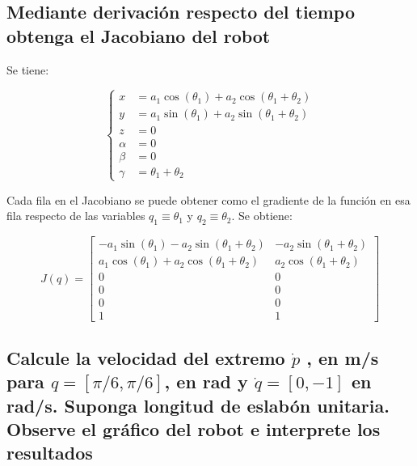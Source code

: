 \documentclass[a4paper,12pt]{article}
\begin{document}
\subsection{Mediante derivación respecto del tiempo obtenga el Jacobiano del robot}
Se tiene:

\begin{equation}
    \left\{
    \begin{aligned}
    x &= a_1 \cos(\theta_1) + a_2 \cos(\theta_1 + \theta_2) \\
    y &= a_1 \sin(\theta_1) + a_2 \sin(\theta_1 + \theta_2) \\
    z &= 0 \\
    \alpha &= 0 \\
    \beta &= 0 \\
    \gamma &= \theta_1 + \theta_2
    \end{aligned}
    \right.
    \label{directa RR}
\end{equation}

Cada fila en el Jacobiano se puede obtener como el gradiente de la función en esa fila
respecto de las variables $q_1\equiv\theta_1$ y $q_2\equiv\theta_2$. Se obtiene:

\begin{equation}
    J(q) = 
    \begin{bmatrix}
        -a_1\sin(\theta_1) - a_2\sin(\theta_1 + \theta_2) & -a_2\sin(\theta_1 + \theta_2)\\
        a_1\cos(\theta_1) + a_2\cos(\theta_1 + \theta_2)  & a_2\cos(\theta_1 + \theta_2)\\
        0                                                 & 0\\
        0                                                 & 0\\
        0                                                 & 0\\
        1                                                 & 1
    \end{bmatrix}
    \label{jacobiano RR}
\end{equation}

\subsection{Calcule la velocidad del extremo $\dot{p}$ , en m/s para $q = [\pi/6, \pi/6]$, en rad y $\dot{q}=
[0, -1]$ en rad/s. Suponga longitud de eslabón unitaria. Observe el gráfico del robot
e interprete los resultados}
\end{document}
